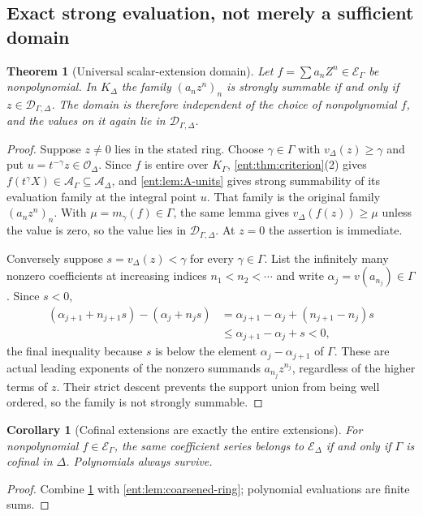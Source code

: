 \documentclass[11pt]{article}
\newtheorem{theorem}{Theorem}[section]
\theoremstyle{plain}
\theoremstyle{plain}
\theoremstyle{plain}
\newtheorem{corollary}[corollary]{Corollary}
\theoremstyle{definition}
\theoremstyle{definition}
\theoremstyle{definition}
\theoremstyle{definition}
\theoremstyle{remark}
\newcommand{\K}{K_\Gamma}\newcommand{\KD}{K_\Delta}
\newcommand{\E}{\mathcal E_\Gamma}
\newcommand{\A}{\mathcal A_\Gamma}\newcommand{\OO}{\mathcal O_\Gamma}
\newcommand{\Dom}{\mathcal D_{\Gamma,\Delta}}
\begin{document}
\subsection{Exact strong evaluation, not merely a sufficient domain}
\begin{theorem}[Universal scalar-extension domain]\label{ent:thm:extension}
Let $f=\sum a_nZ^n\in\E$ be nonpolynomial. In $\KD$ the family $(a_nz^n)_n$
is strongly summable if and only if $z\in\Dom$. The domain is therefore
independent of the choice of nonpolynomial $f$, and the values on it again
lie in $\Dom$.
\end{theorem}
\begin{proof}
Suppose $z\ne0$ lies in the stated ring. Choose $\gamma\in\Gamma$ with
$v_\Delta(z)\ge\gamma$ and put $u=t^{-\gamma}z\in\mathcal O_\Delta$. Since
$f$ is entire over $\K$, \cref{ent:thm:criterion}(2) gives
$f(t^\gamma X)\in\A\subseteq\mathcal A_\Delta$, and
\cref{ent:lem:A-units} gives strong summability of its evaluation family at
the integral point $u$. That family is the original family $(a_nz^n)_n$. With
$\mu=m_\gamma(f)\in\Gamma$, the same lemma gives $v_\Delta(f(z))\ge\mu$
unless the value is zero, so the value lies in $\Dom$. At $z=0$ the assertion
is immediate.

Conversely suppose $s=v_\Delta(z)<\gamma$ for every $\gamma\in\Gamma$. List
the infinitely many nonzero coefficients at increasing indices
$n_1<n_2<\cdots$ and write $\alpha_j=v(a_{n_j})\in\Gamma$. Since $s<0$,
\begin{align*}
 (\alpha_{j+1}+n_{j+1}s)-(\alpha_j+n_js)
 &=\alpha_{j+1}-\alpha_j+(n_{j+1}-n_j)s\\
 &\le\alpha_{j+1}-\alpha_j+s<0,
\end{align*}
the final inequality because $s$ is below the element
$\alpha_j-\alpha_{j+1}$ of $\Gamma$. These are actual leading exponents of
the nonzero summands $a_{n_j}z^{n_j}$, regardless of the higher terms of $z$.
Their strict descent prevents the support union from being well ordered, so
the family is not strongly summable.
\end{proof}

\begin{corollary}[Cofinal extensions are exactly the entire extensions]
\label{ent:cor:entire-extension}
For nonpolynomial $f\in\E$, the same coefficient series belongs to
$\mathcal E_\Delta$ if and only if $\Gamma$ is cofinal in $\Delta$.
Polynomials always survive.
\end{corollary}
\begin{proof}
Combine \cref{ent:thm:extension} with \cref{ent:lem:coarsened-ring};
polynomial evaluations are finite sums.
\end{proof}
\end{document}
